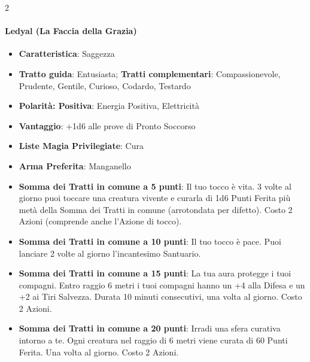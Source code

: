\begin{multicols}{2}
\paragraph{Ledyal (La Faccia della Grazia)}
\begin{itemize}[leftmargin=*] \setlength{\itemsep}{0pt}
\item \textbf{Caratteristica}: Saggezza
\item \textbf{Tratto guida}: Entusiasta; \textbf{Tratti complementari}: Compassionevole, Prudente, Gentile, Curioso, Codardo, Testardo
\item \textbf{Polarità: Positiva}: Energia Positiva, Elettricità
\item \textbf{Vantaggio}: +1d6 alle prove di Pronto Soccorso
\item \textbf{Liste Magia Privilegiate}: Cura
\item \textbf{Arma Preferita}: Manganello
\item \textbf{Somma dei Tratti in comune a 5 punti}: Il tuo tocco è vita. 3 volte al giorno puoi toccare una creatura vivente e curarla di 1d6 Punti Ferita più metà della Somma dei Tratti in comune (arrotondata per difetto). Costo 2 Azioni (comprende anche l'Azione di tocco).
\item \textbf{Somma dei Tratti in comune a 10 punti}: Il tuo tocco è pace. Puoi lanciare 2 volte al giorno l'incantesimo Santuario.
\item \textbf{Somma dei Tratti in comune a 15 punti}: La tua aura protegge i tuoi compagni. Entro raggio 6 metri i tuoi compagni hanno un +4 alla Difesa e un +2 ai Tiri Salvezza. Durata 10 minuti consecutivi, una volta al giorno. Costo 2 Azioni.
\item \textbf{Somma dei Tratti in comune a 20 punti}: Irradi una sfera curativa intorno a te. Ogni creatura nel raggio di 6 metri viene curata di 60 Punti Ferita. Una volta al giorno. Costo 2 Azioni.
\end{itemize}


\end{multicols}
